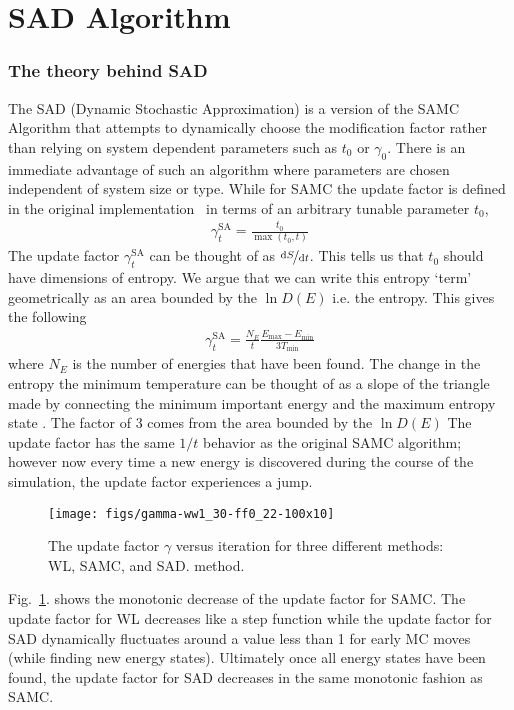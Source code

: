 \documentclass[letterpaper,twocolumn,amsmath,amssymb,pre,aps,10pt]{revtex4-1}
\begin{document}
\section{SAD Algorithm}
\subsubsection{The theory behind SAD}
The SAD (Dynamic Stochastic Approximation) is a version of the SAMC
Algorithm that attempts to dynamically choose the modification factor
rather than relying on system dependent parameters such as $t_0$ or
$\gamma_0$.  There is an immediate advantage of such an algorithm where
parameters are chosen independent of system size or type. While for
SAMC the update factor is defined in the original
implementation~\cite{liang2007stochastic} in terms of an arbitrary
tunable parameter $t_0$,
\begin{align}
\gamma_{t}^{\text{SA}} = \frac{t_0}{\max(t_0,t)}
\end{align}
The update factor $\gamma_{t}^{\text{SA}}$ can be thought of as
$\nicefrac{\text{d}S}{\text{d}t}$. This tells us that $t_0$ should have
dimensions of entropy.  We argue that we can write this entropy `term'
geometrically as an area bounded by the $\ln{D(E)}$ i.e. the entropy.  This
gives the following
\begin{align}
\gamma_{t}^{\text{SA}} =
\frac{N_E}{t}\frac{E_{\text{max}}-E_{\text{min}}}{3T_{\text{min}}}
\end{align}
where $N_E$ is the number of energies that have been found. The change
in the entropy the minimum temperature can be thought of as a slope of
the triangle made by connecting the minimum important energy and the
maximum entropy state .  The factor of $3$ comes from the area bounded
by the $\ln{D(E)}$ The update factor has the same $1/t$ behavior as the
original SAMC algorithm; however now every time a new energy is
discovered during the course of the simulation, the
update factor experiences a jump.

\begin{figure}
  \texttt{[image: figs/gamma-ww1\_30-ff0\_22-100x10]}
  \caption{The update factor $\gamma$ versus iteration for three
    different methods: WL, SAMC, and SAD.
    method.}\label{fig:gamma-vs-t}
\end{figure}

Fig.~\ref{fig:gamma-vs-t}. shows the monotonic decrease of the update
factor for SAMC.  The update factor for WL decreases like a step
function while the update factor for SAD dynamically fluctuates around
a value less than 1 for early MC moves (while finding new energy
states).  Ultimately once all energy states have been found, the update
factor for SAD decreases in the same monotonic fashion as SAMC.
\end{document}
